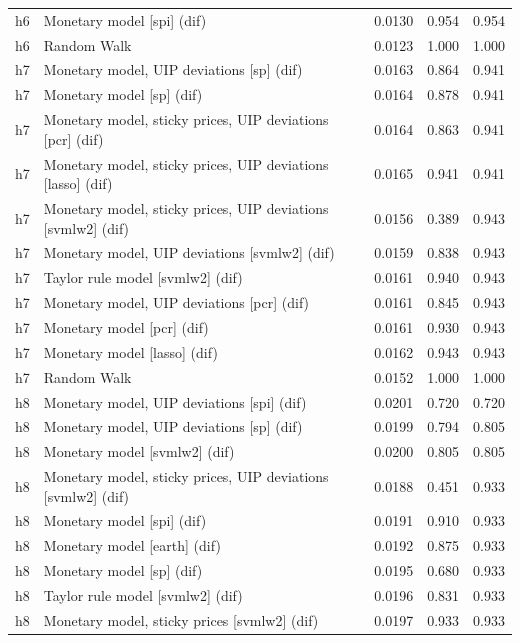 \begin{ThreePartTable}
\begin{longtable}[t]{cp{5.5cm}ccc}
h6 & \raggedright Monetary model [spi] (dif) & 0.0130 & 0.954 & 0.954\\
h6 & \raggedright Random Walk & 0.0123 & 1.000 & 1.000\\
\addlinespace
h7 & \raggedright Monetary model, UIP deviations [sp] (dif) & 0.0163 & 0.864 & 0.941\\
h7 & \raggedright Monetary model [sp] (dif) & 0.0164 & 0.878 & 0.941\\
h7 & \raggedright Monetary model, sticky prices, UIP deviations [pcr] (dif) & 0.0164 & 0.863 & 0.941\\
h7 & \raggedright Monetary model, sticky prices, UIP deviations [lasso] (dif) & 0.0165 & 0.941 & 0.941\\
h7 & \raggedright Monetary model, sticky prices, UIP deviations [svmlw2] (dif) & 0.0156 & 0.389 & 0.943\\
h7 & \raggedright Monetary model, UIP deviations [svmlw2] (dif) & 0.0159 & 0.838 & 0.943\\
h7 & \raggedright Taylor rule model [svmlw2] (dif) & 0.0161 & 0.940 & 0.943\\
h7 & \raggedright Monetary model, UIP deviations [pcr] (dif) & 0.0161 & 0.845 & 0.943\\
h7 & \raggedright Monetary model [pcr] (dif) & 0.0161 & 0.930 & 0.943\\
h7 & \raggedright Monetary model [lasso] (dif) & 0.0162 & 0.943 & 0.943\\
h7 & \raggedright Random Walk & 0.0152 & 1.000 & 1.000\\
\addlinespace
h8 & \raggedright Monetary model, UIP deviations [spi] (dif) & 0.0201 & 0.720 & 0.720\\
h8 & \raggedright Monetary model, UIP deviations [sp] (dif) & 0.0199 & 0.794 & 0.805\\
h8 & \raggedright Monetary model [svmlw2] (dif) & 0.0200 & 0.805 & 0.805\\
h8 & \raggedright Monetary model, sticky prices, UIP deviations [svmlw2] (dif) & 0.0188 & 0.451 & 0.933\\
h8 & \raggedright Monetary model [spi] (dif) & 0.0191 & 0.910 & 0.933\\
h8 & \raggedright Monetary model [earth] (dif) & 0.0192 & 0.875 & 0.933\\
h8 & \raggedright Monetary model [sp] (dif) & 0.0195 & 0.680 & 0.933\\
h8 & \raggedright Taylor rule model [svmlw2] (dif) & 0.0196 & 0.831 & 0.933\\
h8 & \raggedright Monetary model, sticky prices [svmlw2] (dif) & 0.0197 & 0.933 & 0.933\\

\end{longtable}
\end{ThreePartTable}
